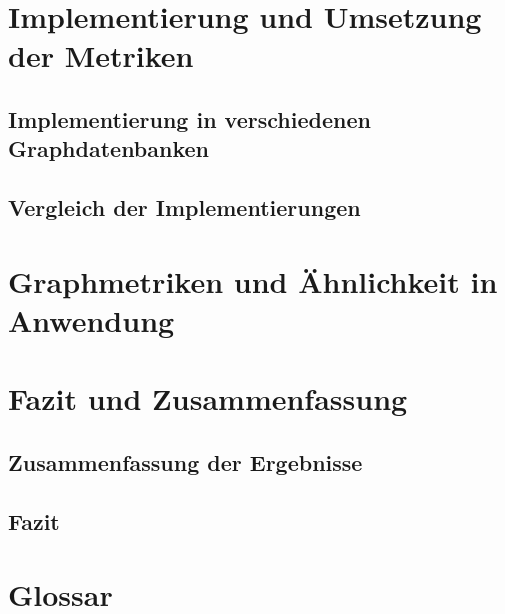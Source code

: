 \documentclass[a4paper,12pt,ngerman,chapterprefix=false,listof=totoc,bibliography=totoc]{scrreprt}
\begin{document}
\chapter{Implementierung und Umsetzung der Metriken}

\section{Implementierung in verschiedenen Graphdatenbanken}

\section{Vergleich der Implementierungen}

\chapter{Graphmetriken und Ähnlichkeit in Anwendung}

\chapter{Fazit und Zusammenfassung}

\section{Zusammenfassung der Ergebnisse}

\section{Fazit}

\chapter*{Glossar}
{
}
\nocite{*}
\printbibliography
\end{document}
